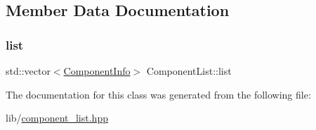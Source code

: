 \subsection{Member Data Documentation}
\mbox{\label{classComponentList_abab41b240f17f716229e5abd5279dd9b}} 
\subsubsection{\texorpdfstring{list}{list}}
{\footnotesize\ttfamily std\+::vector$<$\hyperlink{structComponentInfo}{Component\+Info}$>$ Component\+List\+::list\hspace{0.3cm}{\ttfamily [protected]}}



The documentation for this class was generated from the following file\+:\begin{DoxyCompactItemize}
\item 
lib/\hyperlink{component__list_8hpp}{component\+\_\+list.\+hpp}\end{DoxyCompactItemize}
